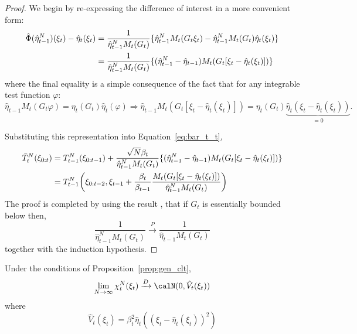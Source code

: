 \begin{proof}
  We begin by re-expressing the difference of interest in a more convenient form:
  \begin{align}
    \hat\Phi(\hat\eta_{t-1}^N)(\xi_t) - \hat\eta_t(\xi_t)
    &= \frac{1}{\hat\eta_{t-1}^NM_t(G_t)}\{
      \hat\eta_{t-1}^NM_t(G_t\xi_t) -
      \hat\eta_{t-1}^NM_t(G_t)\hat\eta_t(\xi_t)\} \notag\\
    &= \frac{1}{\hat\eta_{t-1}^NM_t(G_t)}
    \{(\hat\eta_{t-1}^N-\hat\eta_{t-1})M_t(G_t[\xi_t-\hat\eta_t(\xi_t)])\}
  \end{align}
where the final equality is a simple consequence of the fact that for any
integrable test function $\varphi$:
\begin{equation*}
\hat\eta_{t-1} M_t (G_t \varphi) = \eta_t(G_t) \hat\eta_t(\varphi) \Rightarrow
\hat\eta_{t-1} M_t (G_t [\xi_t - \hat\eta_t(\xi_t)]) = \eta_t(G_t)
\underset{=0}{\underbrace{\hat\eta_t(\xi_t - \hat\eta_t(\xi_t))}} .
\end{equation*}

Substituting this representation into Equation~\eqref{eq:bar_t_t},
  \begin{align}
    \bar{T}_t^N(\xi_{0:t})
    &= T_{t-1}^N(\xi_{0:t-1}) +
    \frac{\sqrt{N}\beta_t}{\hat\eta_{t-1}^NM_t(G_t)}
    \{(\hat\eta_{t-1}^N-\hat\eta_{t-1})M_t(G_t[\xi_t-\hat\eta_t(\xi_t)])\}
    \notag\\
    &= T_{t-1}^N\biggl(\xi_{0:t-2},
    \xi_{t-1} + \frac{\beta_t}{\beta_{t-1}}
    \frac{M_t(G_t[\xi_t-\hat\eta_t(\xi_t)])}{\hat\eta_{t-1}^NM_t(G_t)}\biggr)
  \end{align}
  The proof is completed by using the result \cite[cf.
  Sec.~7.4.3]{DelMoral:2004ux}, that if $G_t$ is essentially bounded below
  then,
  \begin{equation*}
    \frac{1}{\hat\eta_{t-1}^NM_t(G_t)} \xrightarrow{P}
    \frac{1}{\hat\eta_{t-1}M_t(G_t)}
  \end{equation*}
  together with the induction hypothesis.
\end{proof}

\begin{lemma}\label{lem:sampling}
  Under the conditions of Proposition~\ref{prop:gen_clt},
  \begin{equation}
    \lim_{N\to\infty}\chi_t^N(\xi_t)\xrightarrow{D}\calN(0, \hat{V}_t(\xi_t))
  \end{equation}
  where
  \begin{equation}
    \hat{V}_t(\xi_t) = \beta_t^2\hat\eta_t((\xi_t - \hat\eta_t(\xi_t))^2)
  \end{equation}
\end{lemma}

